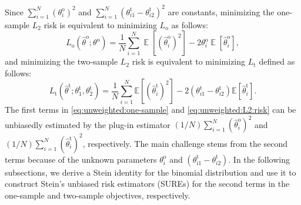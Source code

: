 \documentclass[12pt,letterpaper]{article}
\newcommand{\E}{\operatorname{\mathbb{E}}}
\begin{document}
\noindent Since $\sum_{i=1}^N \left(\theta_i^{\mathrm{o}}\right)^2$ and $\sum_{i=1}^N \left(\theta_{i1}^{\mathrm{t}} - \theta_{i2}^{\mathrm{t}}\right)^2$ are constants, minimizing the one-sample $L_2$ risk is equivalent to minimizing $L_{\mathrm{o}}$ as follows:
\begin{equation}\label{eq:unweighted:one-sample}
    L_{\mathrm{o}}\left(\hat{\theta}^{\mathrm{o}}; \theta^{\mathrm{o}}\right) = \frac{1}{N}\sum_{i=1}^{N}\E\left[\left(\hat{\theta}_i^{\mathrm{o}}\right)^2\right] - 2\theta_i^{\mathrm{o}} \E\left[\hat{\theta}_i^{\mathrm{o}}\right],
\end{equation}
and minimizing the two-sample $L_2$ risk is equivalent to minimizing $L_{\mathrm{t}}$ defined as follows:
\begin{equation}\label{eq:unweighted:L2:risk}
L_{\mathrm{t}}\left(\hat{\theta}^{\mathrm{t}};\theta_1^{\mathrm{t}}, \theta_2^{\mathrm{t}}\right)=\frac{1}{N}\sum_{i=1}^N\mathbb{E}\left[\left(\hat{\theta}_i^{\mathrm{t}}\right)^2\right]-2\left(\theta_{i1}^{\mathrm{t}}-\theta_{i2}^{\mathrm{t}}\right)\mathbb{E}\left[\hat{\theta}_i^{\mathrm{t}}\right].
\end{equation}
The first terms in \eqref{eq:unweighted:one-sample} and \eqref{eq:unweighted:L2:risk} can be unbiasedly estimated by the plug-in estimator $(1/N) \sum_{i=1}^N \left(\hat{\theta}_i^{\mathrm{o}}\right)^2$ and $(1/N) \sum_{i=1}^N \left(\hat{\theta}_i^{\mathrm{t}}\right)^2$, respectively. The main challenge stems from the second terms because of the unknown parameters $\theta_i^\mathrm{o}$ and $(\theta_{i1}^\mathrm{t} - \theta_{i2}^\mathrm{t})$.
In the following subsections, we derive a Stein identity for the binomial distribution and use it to construct Stein’s unbiased risk estimators (SUREs) for the second terms in the one-sample and two-sample objectives, respectively. 

\end{document}
